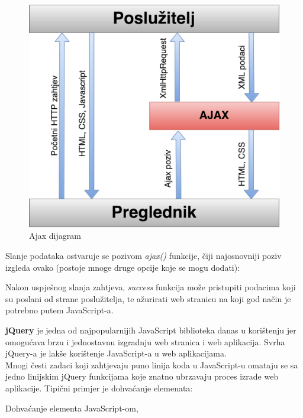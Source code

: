 \documentclass[times, utf8, zavrsni]{fer}
\begin{document}
\begin{figure}[H]
\centering
\includegraphics[scale=0.5]{img/ajax-dijagram.pdf}
\caption{Ajax dijagram}
\label{fig:ajax-dijagram}
\end{figure}
\clearpage
Slanje podataka ostvaruje se pozivom \emph{ajax()} funkcije, čiji najosnovniji poziv izgleda ovako (postoje mnoge druge opcije koje se mogu dodati):

\lstset{style=js, numbers=none}


Nakon uspješnog slanja zahtjeva, \emph{success} funkcija može pristupiti podacima koji su poslani od strane poslužitelja, te ažurirati web stranicu na koji god način je potrebno putem JavaScript-a.

\textbf{jQuery} je jedna od najpopularnijih JavaScript biblioteka danas u korištenju jer omogućava brzu i jednostavnu izgradnju web stranica i web aplikacija. Svrha jQuery-a je lakše korištenje JavaScript-a u web aplikacijama.\\

Mnogi česti zadaci koji zahtjevaju puno linija koda u JavaScript-u omataju se sa jedno linijskim jQuery funkcijama koje znatno ubrzavaju proces izrade web aplikacije. Tipični primjer je dohvaćanje elemenata:

Dohvaćanje elementa JavaScript-om,

\lstset{style=js, numbers=none}

\end{document}
